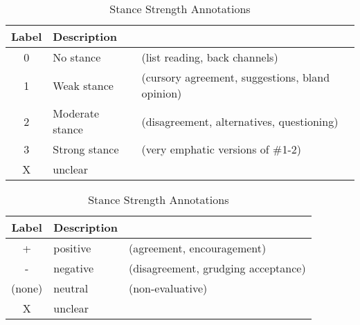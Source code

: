 \begin{table}[H]
\centering
\begin{tabular}{c | l  l } 
	Label  & Description  \\
	\hline 
	0      & No stance & (list reading, back channels) \\ 
	1      & Weak stance & (cursory agreement, suggestions, bland opinion) \\ 
	2      & Moderate stance &(disagreement, alternatives, questioning)  \\ 
	3      & Strong stance & (very emphatic versions of \#1-2) \\
	X      & unclear \\ 
\end{tabular}
\caption{Stance Strength Annotations} 
\label{tab:stance_strength} 
\end{table}

\begin{table}[H]
\centering
\begin{tabular}{c | l  l } 
	Label  & Description  \\
	\hline 
	+      & positive    & (agreement, encouragement) \\ 
	-      & negative    & (disagreement, grudging acceptance) \\ 
	(none) & neutral     &  (non-evaluative) \\ 
	X      & unclear     & \\ 
\end{tabular}
\caption{Stance Strength Annotations} 
\label{tab:stance_polarity} 
\end{table}
